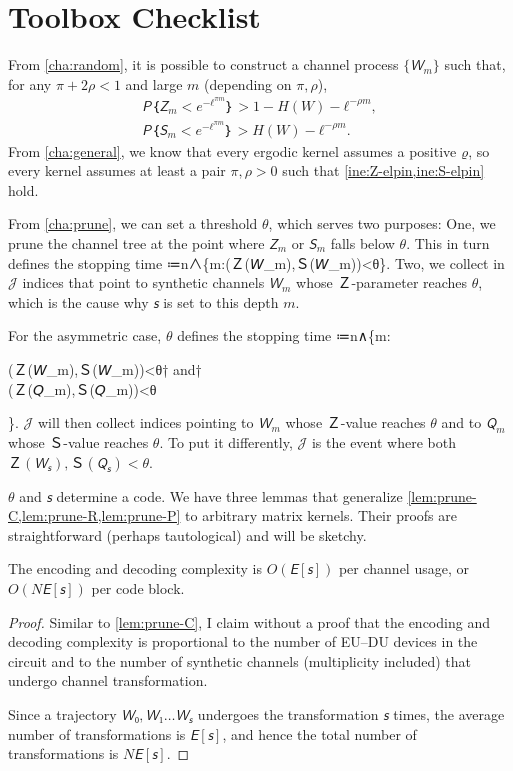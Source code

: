 \documentclass[openany]{amsbook}
\numberwithin{equation}{chapter}
\numberwithin{figure}{chapter}
\numberwithin{table}{chapter}
\def\mat#1{\begin{matrix}#1\end{matrix}}
\def\[#1\]{\begin{equation*}{#1}\end{equation*}}
\theoremstyle{definition}	理dfn:Definition~?s			理exa:Example~?s
\theoremstyle{remark}		理cla:Claim~?s				理rem:Remark~?s
\begin{document}
\section{Toolbox Checklist}

	From \cref{cha:random}, it is possible to construct a channel process $\{𝘞_m\}$
	such that, for any $π+2ρ<1$ and large $m$ (depending on $π,ρ$),
	\begin{gather*}
		𝘗｛𝘡_m<e^{-ℓ^{πm}}｝>1-H(W)-ℓ^{-ρm},	\label{ine:Z-elpin}\\
		𝘗｛𝘚_m<e^{-ℓ^{πm}}｝>H(W)-ℓ^{-ρm}.		\label{ine:S-elpin}
	\end{gather*}
	From \cref{cha:general}, we know that every ergodic kernel
	assumes a positive $ϱ$, so every kernel assumes at least
	a pair $π,ρ>0$ such that \cref{ine:Z-elpin,ine:S-elpin} hold.
	
	From \cref{cha:prune}, we can set a threshold $θ$, which serves two purposes:
	One, we prune the channel tree at the point where $𝘡_m$ or $𝘚_m$ falls below $θ$.
	This in turn defines the stopping time
	\[𝘴≔n∧\min\{m:\min(Ｚ(𝘞_m),Ｓ(𝘞_m))<θ\}.\]
	Two, we collect in $𝒥$ indices that point to synthetic channels $𝘞_m$ whose
	$Ｚ$-parameter reaches $θ$, which is the cause why $𝘴$ is set to this depth $m$.
	
	For the asymmetric case, $θ$ defines the stopping time
	\[𝘴≔n∧\min\left\{m:\mat{
		\min(Ｚ(𝘞_m),Ｓ(𝘞_m))<θ† and†	\\
		\min(Ｚ(𝘘_m),Ｓ(𝘘_m))<θ
	}\right\}.\]
	$𝒥$ will then collect indices pointing
	to $𝘞_m$ whose $Ｚ$-value reaches $θ$ and to $𝘘_m$ whose $Ｓ$-value reaches $θ$.
	To put it differently, $𝒥$ is the event where both $Ｚ(𝘞_𝘴),Ｓ(𝘘_𝘴)<θ$.
	
	$θ$ and $𝘴$ determine a code. 
	We have three lemmas that generalize
	\cref{lem:prune-C,lem:prune-R,lem:prune-P} to arbitrary matrix kernels.
	Their proofs are straightforward (perhaps tautological) and will be sketchy.
	
	\begin{lem}
		The encoding and decoding complexity is
		$O(𝘌[𝘴])$ per channel usage, or $O(N𝘌[𝘴])$ per code block.
	\end{lem}
	
	\begin{proof}
		Similar to \cref{lem:prune-C}, I claim without a proof that
		the encoding and decoding complexity is proportional to  the number of
		EU--DU devices in the circuit and to the number of synthetic channels
		(multiplicity included) that undergo channel transformation.
		
		Since a trajectory $𝘞₀,𝘞₁…𝘞_𝘴$ undergoes the transformation $𝘴$ times,
		the average number of transformations is $𝘌[𝘴]$,
		and hence the total number of transformations is $N𝘌[𝘴]$.
	\end{proof}
	
\end{document}
